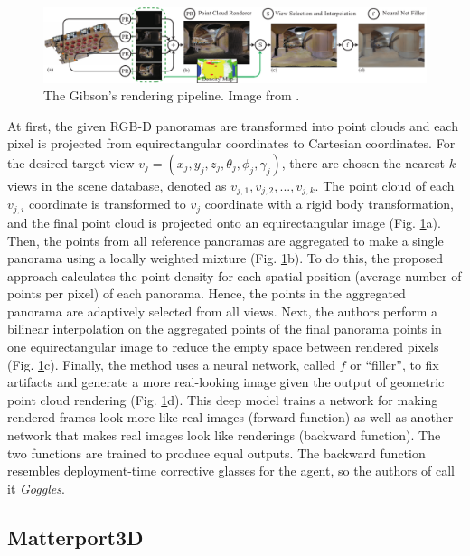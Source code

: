 \begin{figure}[h!]
	\centering
	\includegraphics[width=\linewidth]{images/gibson_rendering_pipeline.pdf}
	\caption{The Gibson's rendering pipeline. Image from \cite{gibson}.}
	\label{fig:gibsonrenderingpipeline}
\end{figure}
At first, the given RGB-D panoramas are transformed into point clouds and each pixel is projected from equirectangular coordinates to Cartesian coordinates. For the desired target view $v_j =
(x_j , y_j , z_j , \theta_j, \phi_j, \gamma_j )$, there are chosen the nearest $k$ views in the
scene database, denoted as $v_{j,1}, v_{j,2}, ..., v_{j,k}$. The point cloud of each $v_{j,i}$ coordinate is transformed to $v_j$ coordinate with a rigid body transformation, and the final point cloud is projected onto an equirectangular image (Fig. \ref{fig:gibsonrenderingpipeline}a). Then, the points from all reference panoramas are aggregated to make a single panorama using a locally weighted mixture (Fig. \ref{fig:gibsonrenderingpipeline}b). To do this, the proposed approach calculates the point density for each spatial position (average number of points per pixel) of each panorama. Hence, the points in the aggregated panorama are adaptively selected from all views. Next, the authors perform a bilinear interpolation on the aggregated points of the final panorama
points in one equirectangular image to reduce the empty space between rendered pixels (Fig. \ref{fig:gibsonrenderingpipeline}c). Finally, the method uses a neural network, called $f$ or ``filler'', to fix artifacts and generate a more real-looking image given the output of geometric point cloud rendering (Fig. \ref{fig:gibsonrenderingpipeline}d). This deep model trains a network for making rendered frames look more like real images (forward function) as well as another network that makes real images look like renderings (backward function). The two functions are trained to produce equal outputs. The backward function resembles deployment-time corrective
glasses for the agent, so the authors of \cite{detr} call it \textit{Goggles}.

\subsection{Matterport3D}

